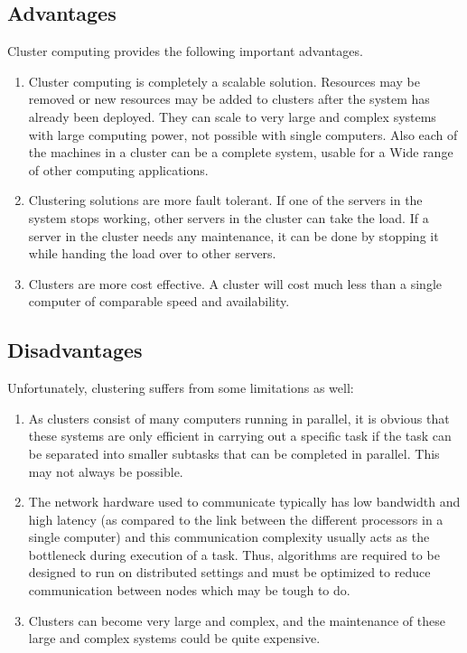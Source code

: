 \documentclass[12pt,notitlepage,oneside]{report}
\begin{document}
\subsection{Advantages}

Cluster computing provides the following important advantages.

\begin{enumerate}
	\item Cluster computing is completely a scalable solution. Resources may be removed or new resources may be added to clusters after the system has already been deployed. They can scale to very large and complex systems with large computing power, not possible with single computers. Also each of the machines in a cluster can be a complete system, usable for a Wide range of other computing applications.
	
	\item Clustering solutions are more fault tolerant. If one of the servers in the system stops working, other servers in the cluster can take the load. If a server in the cluster needs any maintenance, it can be done by stopping it while handing the load over to other servers.
	
	\item Clusters are more cost effective. A cluster will cost much less than a single computer of comparable speed and availability.
	
\end{enumerate}

\subsection{Disadvantages}

Unfortunately, clustering suffers from some limitations as well:

\begin{enumerate}
	\item As clusters consist of many computers running in parallel, it is obvious that these systems are only efficient in carrying out a specific task if the task can be separated into smaller subtasks that can be completed in parallel. This may not always be possible.
	
	\item The network hardware used to communicate typically has low bandwidth and high latency (as compared to the link between the different processors in a single computer) and this communication complexity usually acts as the bottleneck during execution of a task. Thus, algorithms are required to be designed to run on distributed settings and must be optimized to reduce communication between nodes which may be tough to do.
	
	\item Clusters can become very large and complex, and the maintenance of these large and complex systems could be quite expensive.
\end{enumerate}
\end{document}
